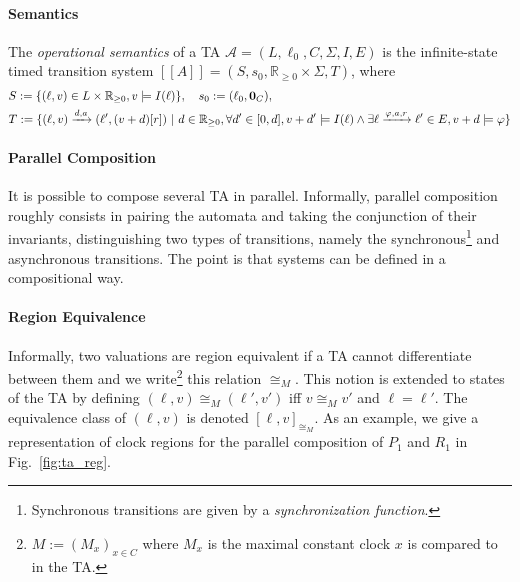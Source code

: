 \documentclass[11pt]{article}
\theoremstyle{definition}
\theoremstyle{remark}
\theoremstyle{definition}
\begin{document}
\paragraph{Semantics}\label{par:semantics}
The \emph{operational semantics} of a TA $\mathcal{A} = (L, \ell_0, C, \Sigma, I, E)$ is the infinite-state timed transition system $[\![A]\!] = (S, s_0, \mathbb{R}_{\geq 0} \times \Sigma, T)$, where
\begin{align*}
	&S := \{(\ell, v) \in L \times \mathbb{R}_{\geq 0}, v \models I(\ell)\}, \quad s_0 := (\ell_0, \text{\bf 0}_C),\\
	&T := \{(\ell, v) \xrightarrow{d, a} (\ell', (v+d)[r]) \ | \ d \in \mathbb{R}_{\geq 0}, \forall d' \in [0, d], v + d' \models I(\ell) \land \exists \ell \xrightarrow{\varphi, a, r} \ell' \in E, v + d \models \varphi \}
\end{align*}


\paragraph{Parallel Composition}\label{par:ta_parcomp}
It is possible to compose several TA in parallel. Informally, parallel composition roughly consists in pairing the automata and taking the conjunction of their invariants, distinguishing two types of transitions, namely the synchronous\footnote{Synchronous transitions are given by a \emph{synchronization function}.} and asynchronous transitions. The point is that systems can be defined in a compositional way.

\paragraph{Region Equivalence}\label{par:ta_regeq}
Informally, two valuations are region equivalent if a TA cannot differentiate between them and we write\footnote{$M := (M_x)_{x \in C}$ where $M_x$ is the maximal constant clock $x$ is compared to in the TA.} this relation $\cong_M$. This notion is extended to states of the TA by defining $(\ell, v) \cong_M (\ell', v')$ iff $v \cong_M v'$ and $\ell = \ell'$. The equivalence class of $(\ell, v)$ is denoted $[\ell, v]_{\cong_M}$.
As an example, we give a representation of clock regions for the parallel composition of $P_1$ and $R_1$ in Fig.~\ref{fig:ta_reg}.
\end{document}
